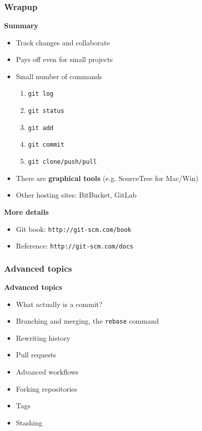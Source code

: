 \documentclass{beamer}
\begin{document}

\begin{frame}
  \frametitle{${}^{}$}
\end{frame}


\begin{frame}
  \frametitle{Wrapup}
  \textbf{\Large Summary}
  \begin{itemize}
    \item Track changes and collaborate
    \item Pays off even for small projects
    \item Small number of commands
      \begin{enumerate}
        \item \texttt{git log}
        \item \texttt{git status}
        \item \texttt{git add}
        \item \texttt{git commit}
        \item \texttt{git clone/push/pull}
      \end{enumerate}
    \item There are \textbf{graphical tools} (e.g. SourceTree for Mac/Win)
    \item Other hosting sites: BitBucket, GitLab
  \end{itemize}
  \textbf{\Large More details}
  \begin{itemize}
  \item Git book: \texttt{http://git-scm.com/book}
  \item Reference: \texttt{http://git-scm.com/docs}
  \end{itemize}
\end{frame}


\begin{frame}
  \frametitle{Advanced topics}
  \textbf{\Large Advanced topics}
  \begin{itemize}
    \item What actually is a commit?
    \item Branching and merging, the \texttt{rebase} command
    \item Rewriting history
    \item Pull requests
    \item Advanced workflows
    \item Forking repositories
    \item Tags
    \item Stashing
  \end{itemize}
\end{frame}
\end{document}

